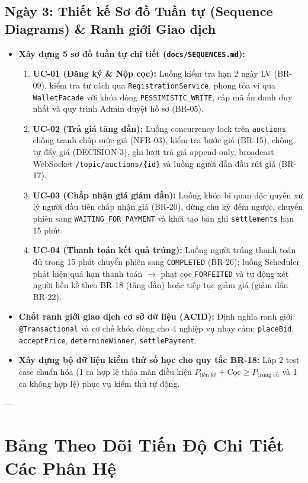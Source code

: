 \documentclass[a4paper]{article}
\begin{document}
\subsection{Ngày 3: Thiết kế Sơ đồ Tuần tự (Sequence Diagrams) \& Ranh giới Giao dịch}
\begin{itemize}
    \item \textbf{Xây dựng 5 sơ đồ tuần tự chi tiết (\texttt{docs/SEQUENCES.md}):}
    \begin{enumerate}
        \item \textbf{UC-01 (Đăng ký \& Nộp cọc):} Luồng kiểm tra hạn 2 ngày LV (BR-09), kiểm tra tư cách qua \texttt{RegistrationService}, phong tỏa ví qua \texttt{WalletFacade} với khóa dòng \texttt{PESSIMISTIC\_WRITE}, cấp mã ẩn danh duy nhất và quy trình Admin duyệt hồ sơ (BR-05).
        \item \textbf{UC-02 (Trả giá tăng dần):} Luồng concurrency lock trên \texttt{auctions} chống tranh chấp mức giá (NFR-03), kiểm tra bước giá (BR-15), chống tự đẩy giá (DECISION-3), ghi lượt trả giá append-only, broadcast WebSocket \texttt{/topic/auctions/\{id\}} và luồng người dẫn đầu rút giá (BR-17).
        \item \textbf{UC-03 (Chấp nhận giá giảm dần):} Luồng khóa bi quan độc quyền xử lý người đầu tiên chấp nhận giá (BR-20), dừng chu kỳ đếm ngược, chuyển phiên sang \texttt{WAITING\_FOR\_PAYMENT} và khởi tạo bản ghi \texttt{settlements} hạn 15 phút.
        \item \textbf{UC-04 (Thanh toán kết quả trúng):} Luồng người trúng thanh toán đủ trong 15 phút chuyển phiên sang \texttt{COMPLETED} (BR-26); luồng Scheduler phát hiện quá hạn thanh toán $\rightarrow$ phạt cọc \texttt{FORFEITED} và tự động xét người liền kề theo BR-18 (tăng dần) hoặc tiếp tục giảm giá (giảm dần BR-22).
    \end{enumerate}
    \item \textbf{Chốt ranh giới giao dịch cơ sở dữ liệu (ACID):} Định nghĩa ranh giới \texttt{@Transactional} và cơ chế khóa dòng cho 4 nghiệp vụ nhạy cảm: \texttt{placeBid}, \texttt{acceptPrice}, \texttt{determineWinner}, \texttt{settlePayment}.
    \item \textbf{Xây dựng bộ dữ liệu kiểm thử số học cho quy tắc BR-18:} Lập 2 test case chuẩn hóa (1 ca hợp lệ thỏa mãn điều kiện $P_{\text{liền kề}} + \text{Cọc} \ge P_{\text{trúng cũ}}$ và 1 ca không hợp lệ) phục vụ kiểm thử tự động.
\end{itemize}

---

\section{Bảng Theo Dõi Tiến Độ Chi Tiết Các Phân Hệ}
\end{document}
